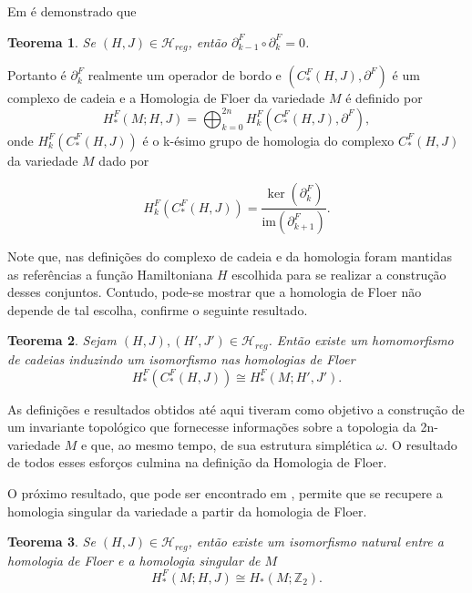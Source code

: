 \documentclass[12pt]{book}
\newtheorem{teorema}{Teorema}[section]
\newcommand{\hamiltonianasRegulares}{\mathcal{H}_{reg}}
\newcommand{\inteiros}{\mathbb{Z}}
\begin{document}
	Em \cite{audi_floer_homology} é demonstrado que 
	
	\begin{teorema}
		Se $(H,J)\in \hamiltonianasRegulares$, então $\partial^{F}_{k-1}\circ \partial^{F}_{k} = 0$.
	\end{teorema}
	
	Portanto é $\partial^{F}_{k}$ realmente um operador de bordo e $(C^{F}_{*}(H,J), \partial^{F})$ é um complexo de cadeia e a Homologia de Floer da variedade $M$ é definido por 
	$$
	H^{F}_{*}(M;H,J)=\bigoplus_{k=0}^{2n}H^{F}_{k}(C^{F}_{*}(H,J), \partial^{F}),
	$$
	onde $H^{F}_{k}(C^{F}_{*}(H,J))$ é o k-ésimo grupo de homologia do complexo $C^{F}_{*}(H,J)$ da variedade $M$ dado por
	
	$$
	H^{F}_{k}(C^{F}_{*}(H,J)) = \frac{\ker(\partial^{F}_{k})}{\text{im}(\partial^{F}_{k+1})}.
	$$ 
	
	Note que, nas definições do complexo de cadeia e da homologia foram mantidas as referências a função Hamiltoniana $H$ escolhida para se realizar a construção desses conjuntos. Contudo,  pode-se mostrar que a homologia de Floer não depende de tal escolha, confirme o seguinte resultado.
	
	\begin{teorema}
		Sejam $(H,J), (H',J') \in \hamiltonianasRegulares$. Então existe um homomorfismo de cadeias induzindo um isomorfismo nas homologias de Floer
		$$
		H^{F}_{*}(C^{F}_{*}(H,J)) \cong H^{F}_{*}(M; H',J'). 
		$$
	\end{teorema}
	
	As definições e resultados obtidos até aqui tiveram como objetivo a construção de um invariante topológico que fornecesse informações sobre a topologia da 2n-variedade $M$ e que, ao mesmo tempo, de sua estrutura simplética $\omega$. O resultado de todos esses esforços culmina na definição da Homologia de Floer.
	
	O próximo resultado, que pode ser encontrado em \cite{salamon_zehnder}, permite que se recupere a homologia singular da variedade a partir da homologia de Floer.
	
	\begin{teorema}\label{teorema_isomorfismo_homologia_floer}
		Se $(H,J) \in \hamiltonianasRegulares$, então 
		existe um isomorfismo natural entre a homologia de Floer e a homologia singular de $M$
		$$
		H^{F}_{*}(M;H,J) \cong H_{*}(M;\inteiros_{2}). 
		$$
		
	\end{teorema}
	
\end{document}
